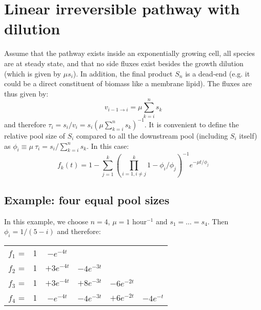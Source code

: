 \documentclass{article}
\newcommand{\flux}[2]{\ensuremath{v_{{#1} \rightarrow {#2}}}}
\begin{document}
\section{Linear irreversible pathway with dilution}\label{sec:linear_examples}
Assume that the pathway exists inside an exponentially growing cell, all species are at steady state, and that no side fluxes exist besides the growth dilution (which is given by $\mu s_i$). In addition, the final product $S_n$ is a dead-end (e.g. it could be a direct constituent of biomass like a membrane lipid). The fluxes are thus given by:
\begin{equation}
    \flux{i-1}{i} = \mu \sum_{k=i}^n s_k
\end{equation}
and therefore $\tau_i = s_i/v_i = s_i (\mu \sum_{k=i}^n s_k)^{-1}$. It is convenient to define the relative pool size of $S_i$ compared to all the downstream pool (including $S_i$ itself) as $\phi_i \equiv \mu~\tau_i = s_i / \sum_{k=i}^n s_k$. In this case:
\begin{equation}\label{eq:dilution}
    f_k(t) = 1 - \sum_{j=1}^{k} \left(\prod_{i = 1, i \neq j}^{k} 1 - \phi_i/\phi_j\right)^{-1} e^{- \mu t / \phi_j}
\end{equation}

\subsection{Example: four equal pool sizes}
In this example, we choose $n = 4$, $\mu = 1$ hour$^{-1}$ and $s_1 = \ldots = s_4$. Then $\phi_i = 1/(5-i)$ and therefore:
\begin{center}
\begin{tabular}{cccccc}
    $f_1$ = & 1 & $- e^{-4t}$ &&&\\
    $f_2$ = & 1 & $+ 3 e^{-4t}$ & $- 4 e^{-3t}$ &&\\
    $f_3$ = & 1 & $+ 3 e^{-4t}$ & $+ 8 e^{-3t}$ & $- 6 e^{-2t}$ &\\
    $f_4$ = & 1 & $- e^{-4t}$   & $- 4 e^{-3t}$ & $+ 6 e^{-2t}$ & $- 4 e^{-t}$
\end{tabular}
\end{center}
\end{document}
